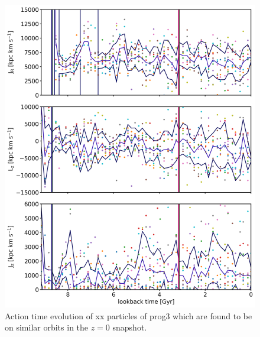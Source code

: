 \iffalse
\begin{figure}
\captionsetup{format=plain}
    \centering
	\includegraphics[width=\textwidth]{plots/Dynamics/prog3/action_time_evolution_box_hist_mean_prog3.png}
    \caption{Action time evolution of xx particles of prog3 which are found to be on similar orbits in the $z=0$ snapshot.}\label{fig:actions_box_time_evolution_prog3}
\end{figure}

